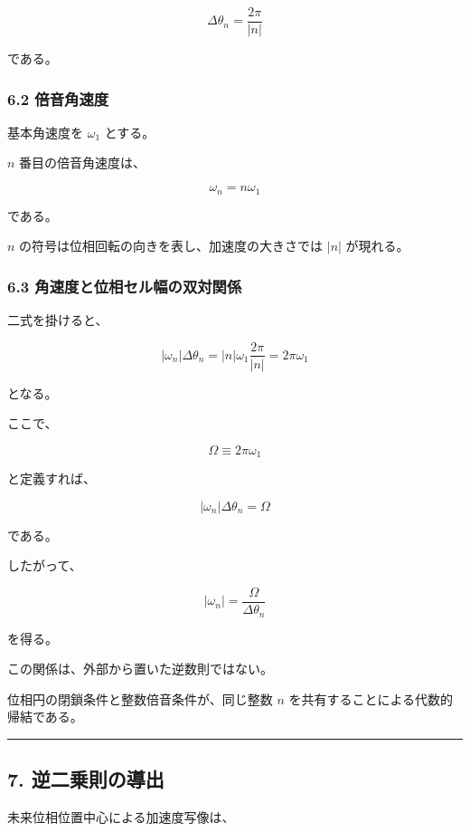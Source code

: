 \documentclass[
  a4paper,
]{ltjsarticle}
\begin{document}
\[
\boxed{
\Delta\theta_n
=\frac{2\pi}{|n|}
}
\]

である。

\subsubsection{6.2 倍音角速度}\label{ux500dux97f3ux89d2ux901fux5ea6}

基本角速度を \(\omega_1\) とする。

\(n\) 番目の倍音角速度は、

\[
\boxed{
\omega_n=n\omega_1
}
\]

である。

\(n\) の符号は位相回転の向きを表し、加速度の大きさでは \(|n|\)
が現れる。

\subsubsection{6.3
角速度と位相セル幅の双対関係}\label{ux89d2ux901fux5ea6ux3068ux4f4dux76f8ux30bbux30ebux5e45ux306eux53ccux5bfeux95a2ux4fc2}

二式を掛けると、

\[
|\omega_n|\Delta\theta_n
=|n|\omega_1\frac{2\pi}{|n|}
=2\pi\omega_1
\]

となる。

ここで、

\[
\Omega\equiv2\pi\omega_1
\]

と定義すれば、

\[
\boxed{
|\omega_n|\Delta\theta_n=\Omega
}
\]

である。

したがって、

\[
\boxed{
|\omega_n|
=\frac{\Omega}{\Delta\theta_n}
}
\]

を得る。

この関係は、外部から置いた逆数則ではない。

位相円の閉鎖条件と整数倍音条件が、同じ整数 \(n\)
を共有することによる代数的帰結である。

\begin{center}\rule{0.5\linewidth}{0.5pt}\end{center}

\subsection{7.
逆二乗則の導出}\label{ux9006ux4e8cux4e57ux5247ux306eux5c0eux51fa}

未来位相位置中心による加速度写像は、
\end{document}
